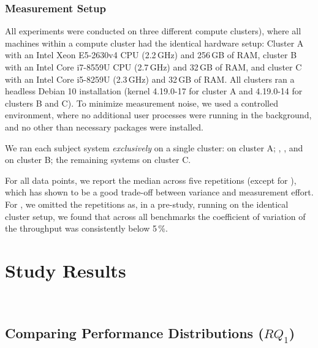 {\subsubsection{Measurement Setup}\label{sec:measurement_setup}
All experiments were conducted on three different compute clusters), where all machines within a compute cluster had the identical hardware setup: Cluster \textsf{A} with an Intel Xeon E5-2630v4 CPU (2.2\,GHz) and 256\,GB of RAM, cluster \textsf{B}  with an Intel Core i7-8559U CPU (2.7\,GHz) and 32\,GB of RAM, and cluster \textsf{C} with an Intel Core i5-8259U (2.3\,GHz) and 32\,GB of RAM. All clusters ran a headless Debian 10 installation (kernel 4.19.0-17 for cluster \textsf{A} and 4.19.0-14 for clusters \textsf{B} and \textsf{C}). To minimize measurement noise, we used a controlled environment, where no additional user processes were running in the background, and no other than necessary packages were installed. 

We ran each subject system \textit{exclusively} on a single cluster: \htwo on cluster \textsf{A}; \dconvert, \batik, and \jadx on cluster \textsf{B}; the remaining systems on cluster \textsf{C}.

For all data points, we report the median across five repetitions (except for \htwo), which has shown to be a good trade-off between variance and measurement effort. For \htwo, we omitted the repetitions as, in a pre-study, running on the identical cluster setup, we found that across all benchmarks the coefficient of variation of the throughput was consistently below 5\,\%.



\section{Study Results}~\label{sec:results}
\subsection{Comparing Performance Distributions ($RQ_1$)}\label{sec:rq1}
}
